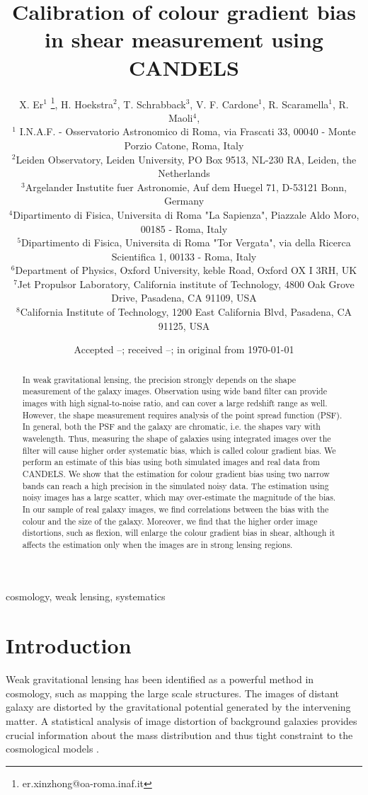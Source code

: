 \documentclass[useAMS,usenatbib]{mn2e}
\title[Colour gradient bias]
{Calibration of colour gradient bias in shear measurement using CANDELS}
\author[Xer et al.]%
{
X. Er$^1$ \thanks{er.xinzhong@oa-roma.inaf.it},
H. Hoekstra$^2$, T. Schrabback$^3$, V. F. Cardone$^1$, R. Scaramella$^1$, R. Maoli$^4$,
\newauthor{M. Vicinanza$^{1,4,5}$, L. Miller$^{6}$, J. Rhodes$^{7,8}$}
\\
$^1$ I.N.A.F. - Osservatorio Astronomico di Roma, via Frascati 33, 00040 - Monte Porzio Catone, Roma, Italy\\
$^2$Leiden Observatory, Leiden University, PO Box 9513, NL-230 RA, Leiden, the Netherlands \\
$^3$Argelander Instutite fuer Astronomie, Auf dem Huegel 71, D-53121 Bonn, Germany\\
$^4$Dipartimento di Fisica, Universita di Roma "La Sapienza", Piazzale Aldo Moro, 00185 - Roma, Italy\\
$^5$Dipartimento di Fisica, Universita di Roma "Tor Vergata", via della Ricerca Scientifica 1, 00133 - Roma, Italy\\
$^6$Department of Physics, Oxford University, keble Road, Oxford OX I 3RH, UK\\
$^7$Jet Propulsor Laboratory, California institute of Technology, 4800 Oak Grove Drive, Pasadena, CA 91109, USA\\
$^8$California Institute of Technology, 1200 East California Blvd, Pasadena, CA 91125, USA
}
\date{Accepted --;  received --;  in original from \today}
\begin{document}
\maketitle

\begin{abstract}
  In weak gravitational lensing, the precision strongly depends on
  the shape measurement of the galaxy images. Observation using wide
  band filter can provide images with high signal-to-noise ratio, and
  can cover a large redshift range as well. However, the shape
  measurement requires analysis of the point spread function
  (PSF). In general, both the PSF and the galaxy are chromatic,
  i.e. the shapes vary with wavelength. Thus, measuring the shape of
  galaxies using integrated images over the filter will cause higher
  order systematic bias, which is called colour gradient bias. 
  We perform an estimate of this bias using both simulated
  images and real data from CANDELS. We show that the estimation for
  colour gradient bias using two narrow bands can reach a high precision
  in the simulated noisy data. The estimation using noisy images has a
  large scatter, which may over-estimate the magnitude of the bias.
  In our sample of real galaxy images, we find correlations between
  the bias with the colour and the size of the galaxy. Moreover, we
  find that the higher order image distortions, such as flexion, will
  enlarge the colour gradient bias in shear, although it affects
  the estimation only when the images are in strong lensing regions.
\end{abstract}
\begin{keywords} cosmology, weak lensing, systematics
\end{keywords}


\section{Introduction}

Weak gravitational lensing has been identified as a powerful method in
cosmology, such as mapping the large scale structures. The images of
distant galaxy are distorted by the gravitational potential generated
by the intervening matter. A statistical analysis of image distortion
of background galaxies provides crucial information about the mass
distribution and thus tight constraint to the cosmological models
\citep[e.g.][]{2001PhR...340..291B,2008ARNPS..58...99H}.
\end{document}
